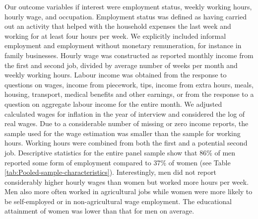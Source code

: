 \documentclass[10pt,letterpaper]{article}
\begin{document}
Our outcome variables if interest were employment status, weekly working hours, hourly wage, and occupation. Employment status was defined as having carried out an activity that helped with the household expenses the last week and working for at least four hours per week. We explicitly included informal employment and employment without monetary remuneration, for instance in family businesses.  Hourly wage was constructed as reported monthly income from the first and second job, divided by average number of weeks per month and weekly working hours.  Labour income was obtained from the response to questions on wages, income from piecework, tips, income from extra hours, meals, housing, transport, medical benefits and other earnings, or from the response to a question on aggregate labour income for the entire month. We adjusted calculated wages for inflation in the year of interview and considered the log of real wages. Due to a considerable number of missing or zero income reports, the sample used for the wage estimation was smaller than the sample for working hours. Working hours were combined from both the first and a potential second job. Descriptive statistics for the entire panel sample show that 86\% of men reported some form of employment compared to 37\% of women (see Table \ref{tab:Pooled-sample-characteristics}). Interestingly, men did not report considerably higher hourly wages than women but worked more hours per week. Men also more often worked in agricultural jobs while women were more likely to be self-employed or in non-agricultural wage employment. The educational attainment of women was lower than that for men on average.
\end{document}
